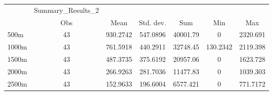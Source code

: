 \begin{tabular}{l*{6}{c}}
\hline\hline
            &Summary\_Results\_2&            &            &            &            &            \\
            &         Obs&        Mean&   Std. dev.&         Sum&         Min&         Max\\
\hline
500m        &          43&    930.2742&    547.0896&    40001.79&           0&    2320.691\\
1000m       &          43&    761.5918&    440.2911&    32748.45&    130.2342&    2119.398\\
1500m       &          43&    487.3735&    375.6192&    20957.06&           0&    1623.728\\
2000m       &          43&    266.9263&    281.7036&    11477.83&           0&    1039.303\\
2500m       &          43&    152.9633&    196.6004&    6577.421&           0&    771.7172\\
\hline\hline
\end{tabular}
